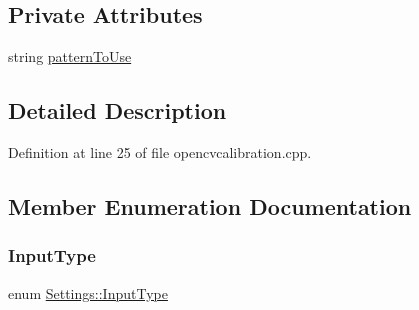 \subsection*{Private Attributes}
\begin{DoxyCompactItemize}
\item 
string \mbox{\hyperlink{class_settings_ae8df4a531058c0dc6b544aff531e55ef}{pattern\+To\+Use}}
\end{DoxyCompactItemize}


\subsection{Detailed Description}


Definition at line 25 of file opencvcalibration.\+cpp.



\subsection{Member Enumeration Documentation}
\mbox{\label{class_settings_a5afe85d24b071973a7f248c05386f7f4}} 
\subsubsection{\texorpdfstring{InputType}{InputType}}
{\footnotesize\ttfamily enum \mbox{\hyperlink{class_settings_a5afe85d24b071973a7f248c05386f7f4}{Settings\+::\+Input\+Type}}}

